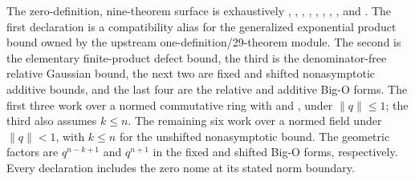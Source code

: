 \documentclass[11pt,a4paper,oneside,openany]{book}
\theoremstyle{definition}
\theoremstyle{remark}
\begin{document}
The zero-definition, nine-theorem
 surface is exhaustively
,
,
,
,
,
,
,
, and
.  The first
declaration is a compatibility alias for the generalized exponential product
bound owned by the upstream one-definition/29-theorem module.  The second is
the elementary finite-product defect bound, the third is the denominator-free
relative Gaussian bound, the next two are fixed and shifted nonasymptotic
additive bounds, and the last four are the relative and additive Big-O forms.
The first three work over a normed commutative ring with
 and , under
\(\lVert q\rVert\leq1\); the third also assumes \(k\leq n\).
The remaining six work over a normed field under \(\lVert q\rVert<1\),
with \(k\leq n\) for the unshifted nonasymptotic bound.  The geometric
factors are \(q^{n-k+1}\) and \(q^{n+1}\) in the fixed and shifted Big-O
forms, respectively.  Every declaration includes the zero nome at its stated
norm boundary.
\end{document}
